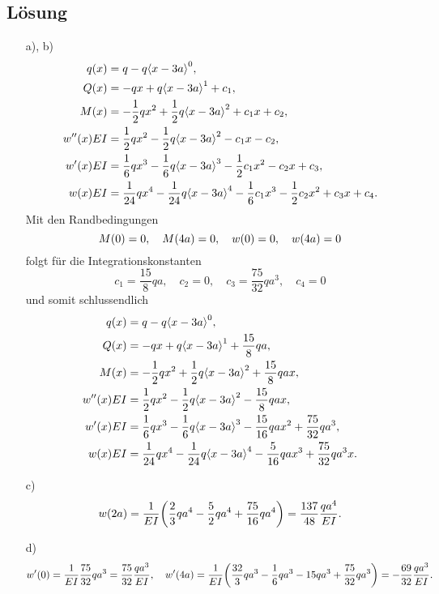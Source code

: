 \documentclass{exercise}
\begin{document}
    \subsection*{Lösung}
    \begin{enumerate}
        \item[a), b)]
        \begin{align*}
            q\parentheses*{x} &= q - q\angles*{x - 3a}^0,\\
            Q\parentheses*{x} &= -qx + q\angles*{x - 3a}^1 + c_1,\\
            M\parentheses*{x} &= -\frac{1}{2}qx^2 + \frac{1}{2}q\angles*{x - 3a}^2 + c_1 x + c_2,\\
            w''\parentheses*{x}EI &= \frac{1}{2}qx^2 - \frac{1}{2}q\angles*{x - 3a}^2 - c_1 x - c_2,\\
            w'\parentheses*{x}EI &= \frac{1}{6}qx^3 - \frac{1}{6}q\angles*{x - 3a}^3 - \frac{1}{2}c_1 x^2 - c_2 x + c_3,\\
            w\parentheses*{x}EI &= \frac{1}{24}qx^4 - \frac{1}{24}q\angles*{x - 3a}^4 - \frac{1}{6}c_1 x^3 - \frac{1}{2}c_2 x^2 + c_3 x + c_4.
        \end{align*}
        Mit den Randbedingungen
        \[
            M\parentheses*{0} = 0, \quad M\parentheses*{4a} = 0, \quad w\parentheses*{0} = 0, \quad w\parentheses*{4a} = 0
        \]
        folgt für die Integrationskonstanten
        \[
            c_1 = \frac{15}{8}qa, \quad c_2 = 0, \quad c_3 = \frac{75}{32}qa^3, \quad c_4 = 0
        \]
        und somit schlussendlich
        \begin{align*}
            q\parentheses*{x} &= q - q\angles*{x - 3a}^0,\\
            Q\parentheses*{x} &= -qx + q\angles*{x - 3a}^1 + \frac{15}{8}qa,\\
            M\parentheses*{x} &= -\frac{1}{2}qx^2 + \frac{1}{2}q\angles*{x - 3a}^2 + \frac{15}{8}qax,\\
            w''\parentheses*{x}EI &= \frac{1}{2}qx^2 - \frac{1}{2}q\angles*{x - 3a}^2 - \frac{15}{8}qax,\\
            w'\parentheses*{x}EI &= \frac{1}{6}qx^3 - \frac{1}{6}q\angles*{x - 3a}^3 - \frac{15}{16}qax^2 + \frac{75}{32}qa^3,\\
            w\parentheses*{x}EI &= \frac{1}{24}qx^4 - \frac{1}{24}q\angles*{x - 3a}^4 - \frac{5}{16}qax^3 + \frac{75}{32}qa^3 x.
        \end{align*}
        \item[c)]
        \[
            w\parentheses*{2a} = \frac{1}{EI}\parentheses*{\frac{2}{3}qa^4 - \frac{5}{2}qa^4 + \frac{75}{16}qa^4} = \frac{137}{48}\frac{qa^4}{EI}.
        \]
        \item[d)]
        \[
            w'\parentheses*{0} = \frac{1}{EI}\frac{75}{32}qa^3 = \frac{75}{32}\frac{qa^3}{EI}, \quad w'\parentheses*{4a} = \frac{1}{EI}\parentheses*{\frac{32}{3}qa^3 - \frac{1}{6}qa^3 - 15qa^3 + \frac{75}{32}qa^3} = -\frac{69}{32}\frac{qa^3}{EI}.
        \]
    \end{enumerate}
\end{document}
